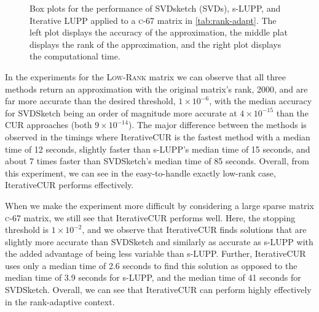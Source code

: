 \begin{figure}[h]
    \centering
    
    \caption{Box plots for the performance of SVDsketch (SVDs), s-LUPP, and Iterative LUPP applied to a \textsc{c-67} matrix in \cref{tab:rank-adapt}. The left plot displays the accuracy of the approximation, the middle plat displays the rank of the approximation, and the right plot displays the computational time.}
    \label{fig:c-67}
\end{figure}
In the experiments for the \textsc{Low-Rank} matrix we can observe that all three methods return an approximation with the original matrix's rank, 2000, and are far more accurate than the desired threshold, $1\times 10^{-6}$, with the median accuracy for SVDSketch being an order of magnitude more accurate at $4 \times 10^{-15}$ than the CUR approaches (both $9 \times 10^{-14}$). The major difference between the methods is observed in the timings where IterativeCUR is the fastest method with a median time of 12 seconds, slightly faster than s-LUPP's median time of 15 seconds, and about 7 times faster than SVDSketch's median time of 85 seconds. Overall, from this experiment, we can see in the easy-to-handle exactly low-rank case, IterativeCUR performs effectively. 

When we make the experiment more difficult by considering a large sparse matrix \textsc{c-67} matrix, we still see that IterativeCUR performs well. Here, the stopping threshold is $1\times 10^{-2}$, and we observe that IterativeCUR finds solutions that are slightly more accurate than SVDSketch and similarly as accurate as s-LUPP with the added advantage of being less variable than s-LUPP. Further, IterativeCUR uses only a median time of 2.6 seconds to find this solution as opposed to the median time of 3.9 seconds for s-LUPP, and the median time of 41 seconds for SVDSketch. Overall, we can see that IterativeCUR can perform highly effectively in the rank-adaptive context.

